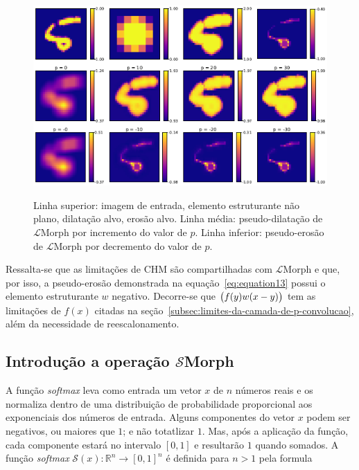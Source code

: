 \begin{figure}[h]
    \caption{Linha superior: imagem de entrada, elemento estruturante não plano, dilatação alvo, erosão alvo. Linha média: pseudo-dilatação de $\mathcal{L}$Morph por incremento do valor de $p$. Linha inferior: pseudo-erosão de $\mathcal{L}$Morph por decremento do valor de $p$.}
    \centering
    \includegraphics[scale=0.9]{images/LMorph}
    \label{fig:lmporh}
\end{figure}

Ressalta-se que as limitações de CHM são compartilhadas com $\mathcal{L}$Morph e que, por isso, a pseudo-erosão demonstrada na equação~\ref{eq:equation13} possui o elemento estruturante $w$ negativo.
Decorre-se que $\big{(}f(y)w(x-y)\big{)}$ tem as limitações de $f(x)$ citadas na seção~\ref{subsec:limites-da-camada-de-p-convolucao}, além da necessidade de reescalonamento.

\subsection{Introdução a operação $\mathcal{S}$Morph}
\label{subsec:introducao-a-operacao-smorph}

A função \emph{softmax} leva como entrada um vetor $x$ de $n$ números reais e os normaliza dentro de uma distribuição de probabilidade proporcional aos exponenciais dos números de entrada.
Alguns componentes do vetor $x$ podem ser negativos, ou maiores que $1$; e não totatlizar $1$.
Mas, após a aplicação da função, cada componente estará no intervalo $[0, 1]$ e resultarão $1$ quando somados.
A função \emph{softmax} $\mathcal{S}(x): \mathbb{R}^{n} \to [0, 1]^{n}$ é definida para $n > 1$ pela formula

